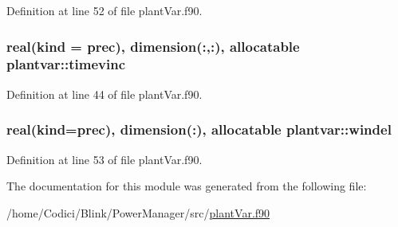 Definition at line 52 of file plant\-Var.\-f90.

\hypertarget{classplantvar_aade5aa28513690acf2cf215b0dc1acd2}{
\subsubsection[{timevinc}]{\setlength{\rightskip}{0pt plus 5cm}real(kind = prec), dimension(\-:,\-:), allocatable plantvar\-::timevinc}}\label{classplantvar_aade5aa28513690acf2cf215b0dc1acd2}


Definition at line 44 of file plant\-Var.\-f90.

\hypertarget{classplantvar_a90a77172411c06cf156d494ea2902bfd}{
\subsubsection[{windel}]{\setlength{\rightskip}{0pt plus 5cm}real(kind=prec), dimension(\-:), allocatable plantvar\-::windel}}\label{classplantvar_a90a77172411c06cf156d494ea2902bfd}


Definition at line 53 of file plant\-Var.\-f90.



The documentation for this module was generated from the following file\-:\begin{DoxyCompactItemize}
\item 
/home/\-Codici/\-Blink/\-Power\-Manager/src/\hyperlink{plant_var_8f90}{plant\-Var.\-f90}\end{DoxyCompactItemize}
